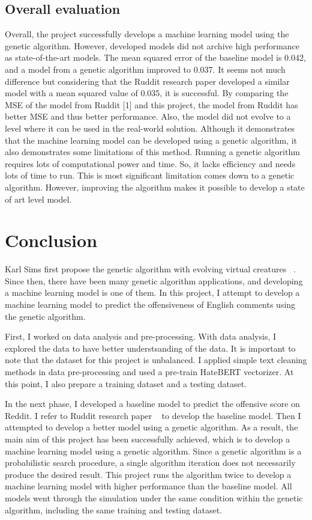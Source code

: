 \documentclass[11pt, natbib=false]{article}
\begin{document}
\subsection{Overall evaluation}
Overall, the project successfully develops a machine learning model using the genetic algorithm.
However, developed models did not archive high performance as state-of-the-art models.
The mean squared error of the baseline model is 0.042, and a model from a genetic algorithm improved to 0.037.
It seems not much difference but considering that the Ruddit research paper developed a similar model with a mean squared value of 0.035, it is successful.
By comparing the MSE of the model from Ruddit [1] and this project, the model from Ruddit has better MSE and thus better performance.
Also, the model did not evolve to a level where it can be used in the real-world solution.
Although it demonstrates that the machine learning model can be developed using a genetic algorithm, it also demonstrates some limitations of this method.
Running a genetic algorithm requires lots of computational power and time.
So, it lacks efficiency and needs lots of time to run.
This is most significant limitation comes down to a genetic algorithm.
However, improving the algorithm makes it possible to develop a state of art level model.

\section{Conclusion}
Karl Sims first propose the genetic algorithm with evolving virtual creatures ~\cite{sims1994evolving}.
Since then, there have been many genetic algorithm applications, and developing a machine learning model is one of them.
In this project, I attempt to develop a machine learning model to predict the offensiveness of English comments using the genetic algorithm.

First, I worked on data analysis and pre-processing.
With data analysis, I explored the data to have better understsanding of the data.
It is important to note that the dataset for this project is unbalanced.
I applied simple text cleaning methods in data pre-processing and used a pre-train HateBERT vectorizer.
At this point, I also prepare a training dataset and a testing dataset.

In the next phase, I developed a baseline model to predict the offensive score on Reddit.
I refer to Ruddit research paper ~\cite{hada2021ruddit} to develop the baseline model.
Then I attempted to develop a better model using a genetic algorithm.
As a result, the main aim of this project has been successfully achieved, which is to develop a machine learning model using a genetic algorithm.
Since a genetic algorithm is a probabilistic search procedure, a single algorithm iteration does not necessarily produce the desired result.
This project runs the algorithm twice to develop a machine learning model with higher performance than the baseline model.
All models went through the simulation under the same condition within the genetic algorithm, including the same training and testing dataset.
\end{document}
